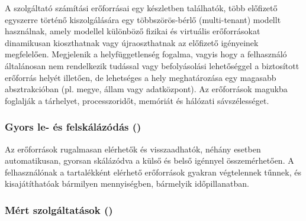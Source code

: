 A szolgáltató számítási erőforrásai egy készletben találhatók, több előfizető egyszerre történő kiszolgálására egy többszörös-bérlő (multi-tenant) modellt használnak, amely modellel különböző fizikai és virtuális erőforrásokat dinamikusan kioszthatnak vagy újraoszthatnak az előfizető igényeinek megfelelően. Megjelenik a helyfüggetlenség fogalma, vagyis hogy a felhasználó általánosan nem rendelkezik tudással vagy befolyásolási lehetőséggel a biztosított erőforrás helyét illetően, de lehetséges a hely meghatározása egy magasabb absztrakcióban (pl. megye, állam vagy adatközpont). Az erőforrások magukba foglalják a tárhelyet, processzoridőt, memóriát és hálózati sávszélességet.

\subsubsection{Gyors le- és felskálázódás ()}

Az erőforrások rugalmasan elérhetők és visszaadhatók, néhány esetben automatikusan, gyorsan skálázódva a külső és belső igénnyel összemérhetően. A felhasználónak a tartalékként elérhető erőforrások gyakran végtelennek tűnnek, és kisajátíthatóak bármilyen mennyiségben, bármelyik időpillanatban.

\subsubsection{Mért szolgáltatások ()}

